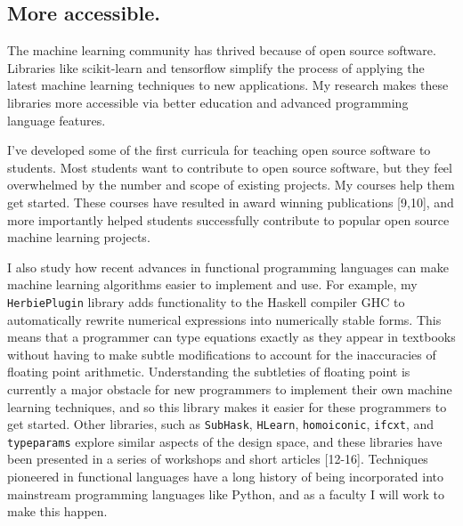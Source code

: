 \documentclass[12pt]{article}
\begin{document}
\vspace{-0.15in}
\subsection*{More accessible.}

The machine learning community has thrived because of open source software.
Libraries like scikit-learn and tensorflow simplify the process of applying the latest machine learning techniques to new applications.
My research makes these libraries more accessible via better education and advanced programming language features.

I've developed some of the first curricula for teaching open source software to students.
Most students want to contribute to open source software, 
but they feel overwhelmed by the number and scope of existing projects.
My courses help them get started.
These courses have resulted in award winning publications [9,10],
and more importantly helped students successfully contribute to popular open source machine learning projects.

I also study how recent advances in functional programming languages can make machine learning algorithms easier to implement and use.
For example, my \texttt{HerbiePlugin} library adds functionality to the Haskell compiler GHC to automatically rewrite numerical expressions into numerically stable forms.
This means that a programmer can type equations exactly as they appear in textbooks without having to make subtle modifications to account for the inaccuracies of floating point arithmetic. 
Understanding the subtleties of floating point is currently a major obstacle for new programmers to implement their own machine learning techniques,
and so this library makes it easier for these programmers to get started.
Other libraries, such as \texttt{SubHask}, \texttt{HLearn}, \texttt{homoiconic}, \texttt{ifcxt}, and \texttt{typeparams} explore similar aspects of the design space,
and these libraries have been presented in a series of workshops and short articles [12-16].
Techniques pioneered in functional languages have a long history of being incorporated into mainstream programming languages like Python,
and as a faculty I will work to make this happen.
\end{document}
